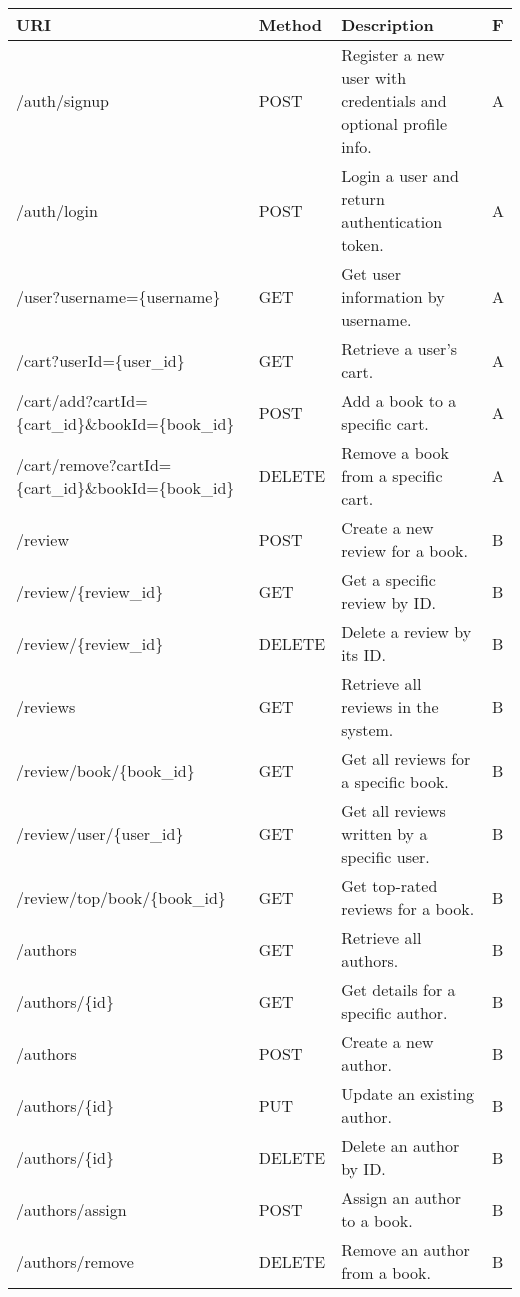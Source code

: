 \begin{longtable}{|p{}|p{} |p{}|p{}|} 
\hline
\textbf{URI} & \textbf{Method} & \textbf{Description} & \textbf{F} 
\\\hline

/auth/signup & POST & Register a new user with credentials and optional profile info. & A \\
\hline
/auth/login & POST & Login a user and return authentication token. & A \\
\hline
/user?username=\{username\} & GET & Get user information by username. & A \\
\hline
/cart?userId=\{user\_id\} & GET & Retrieve a user's cart. & A \\
\hline
/cart/add?cartId=\{cart\_id\}\&bookId=\{book\_id\} & POST & Add a book to a specific cart. & A \\
\hline
/cart/remove?cartId=\{cart\_id\}\&bookId=\{book\_id\} & DELETE & Remove a book from a specific cart. & A \\
\hline
/review & POST & Create a new review for a book. & B \\
\hline
/review/\{review\_id\} & GET & Get a specific review by ID. & B \\
\hline
/review/\{review\_id\} & DELETE & Delete a review by its ID. & B \\
\hline
/reviews & GET & Retrieve all reviews in the system. & B \\
\hline
/review/book/\{book\_id\} & GET & Get all reviews for a specific book. & B \\
\hline
/review/user/\{user\_id\} & GET & Get all reviews written by a specific user. & B \\
\hline
/review/top/book/\{book\_id\} & GET & Get top-rated reviews for a book. & B \\
\hline
/authors & GET & Retrieve all authors. & B \\
\hline
/authors/\{id\} & GET & Get details for a specific author. & B \\
\hline
/authors & POST & Create a new author. & B \\
\hline
/authors/\{id\} & PUT & Update an existing author. & B \\
\hline
/authors/\{id\} & DELETE & Delete an author by ID. & B \\
\hline
/authors/assign & POST & Assign an author to a book. & B \\
\hline
/authors/remove & DELETE & Remove an author from a book. & B \\

\end{longtable}
